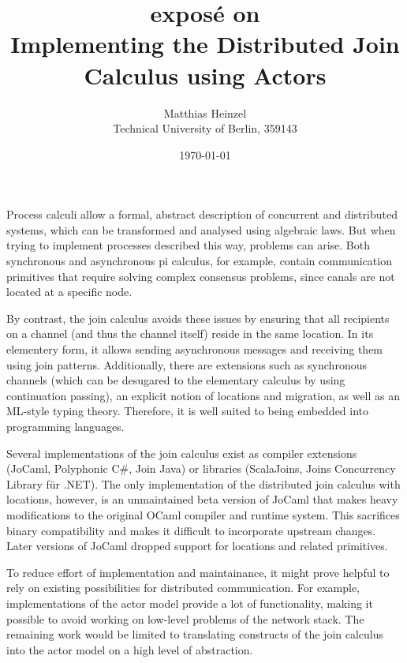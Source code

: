 \documentclass[12pt]{article}
\title{
  {\large expos\'e on} \\
  Implementing the Distributed Join Calculus using Actors
}
\author{Matthias Heinzel\\Technical University of Berlin, 359143}
\date{\today}
\begin{document}
\maketitle

Process calculi allow a formal, abstract description of concurrent and distributed systems, which can be transformed and analysed using algebraic laws.
But when trying to implement processes described this way, problems can arise.
Both synchronous and asynchronous pi calculus, for example, contain communication primitives that require solving complex consensus problems, since canals are not located at a specific node.

By contrast, the join calculus avoids these issues by ensuring that all recipients on a channel (and thus the channel itself) reside in the same location\cite{fournet_reflexive_1996}.
In its elementery form, it allows sending asynchronous messages and receiving them using join patterns.
Additionally, there are extensions such as synchronous channels (which can be desugared to the elementary calculus by using continuation passing), an explicit notion of locations and migration\cite{fournet_calculus_1996}, as well as an ML-style typing theory\cite{fournet_implicit_1997}. Therefore, it is well suited to being embedded into programming languages.

Several implementations of the join calculus exist as compiler extensions (JoCaml\cite{mandel_programming_2007}, Polyphonic C\#\cite{benton_modern_2002}, Join Java\cite{itzstein_implementing_2003}) or libraries (ScalaJoins\cite{haller_implementing_2008}, Joins Concurrency Library für .NET\cite{russo_joins_2007}).
The only implementation of the distributed join calculus with locations, however, is an unmaintained beta version of JoCaml that makes heavy modifications to the original OCaml compiler and runtime system\cite{conchon_jocaml:_1999}.
This sacrifices binary compatibility and makes it difficult to incorporate upstream changes. Later versions of JoCaml dropped support for locations and related primitives.

To reduce effort of implementation and maintainance, it might prove help\-ful to rely on existing possibilities for distributed communication. For example, implementations of the actor model provide a lot of functionality, making it possible to avoid working on low-level problems of the network stack.
The remaining work would be limited to translating constructs of the join calculus into the actor model on a high level of abstraction.
\end{document}
